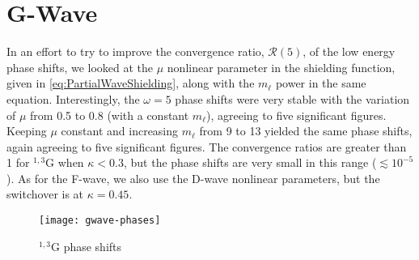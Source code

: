 \documentclass[Dissertation.tex]{subfiles}
\begin{document}
\section{G-Wave}
\label{sec:GWave}

In an effort to try to improve the convergence ratio, $\mathcal{R}(5)$,
of the low energy phase shifts, we
looked at the $\mu$ nonlinear parameter in the shielding function, given
in \cref{eq:PartialWaveShielding}, along with the $m_\ell$ power in the same
equation. Interestingly, the $\omega = 5$ phase shifts were very stable with
the variation of $\mu$ from 0.5 to 0.8 (with a constant $m_\ell$), agreeing to
five significant figures. Keeping $\mu$ constant and increasing $m_\ell$ from
9 to 13 yielded the same phase shifts, again agreeing to five significant
figures. The convergence ratios are greater than 1 for $^{1,3}$G when
$\kappa < 0.3$, but the phase shifts are very small in this range
($\lesssim 10^{-5}$). As for the F-wave, we also use the D-wave nonlinear
parameters, but the switchover is at $\kappa = 0.45$.


\begin{figure}[H]
	\centering
	\texttt{[image: gwave-phases]}
	\caption{$^{1,3}$G phase shifts}
	\label{fig:GWavePhase}
\end{figure}

\end{document}
